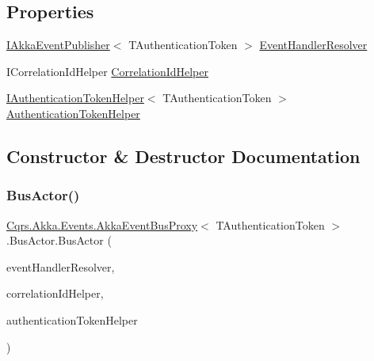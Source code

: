 \subsection*{Properties}
\begin{DoxyCompactItemize}
\item 
\hyperlink{interfaceCqrs_1_1Akka_1_1Events_1_1IAkkaEventPublisher}{I\+Akka\+Event\+Publisher}$<$ T\+Authentication\+Token $>$ \hyperlink{classCqrs_1_1Akka_1_1Events_1_1AkkaEventBusProxy_1_1BusActor_ae7986841b1bb97368936c52655b72f96}{Event\+Handler\+Resolver}
\item 
I\+Correlation\+Id\+Helper \hyperlink{classCqrs_1_1Akka_1_1Events_1_1AkkaEventBusProxy_1_1BusActor_a4857b2d33de5de94001abf96710b1308}{Correlation\+Id\+Helper}
\item 
\hyperlink{interfaceCqrs_1_1Authentication_1_1IAuthenticationTokenHelper}{I\+Authentication\+Token\+Helper}$<$ T\+Authentication\+Token $>$ \hyperlink{classCqrs_1_1Akka_1_1Events_1_1AkkaEventBusProxy_1_1BusActor_a5a276908d994a77c84e12e73ff73a286}{Authentication\+Token\+Helper}
\end{DoxyCompactItemize}


\subsection{Constructor \& Destructor Documentation}
\mbox{\label{classCqrs_1_1Akka_1_1Events_1_1AkkaEventBusProxy_1_1BusActor_aeb7cebaad75d810375d0adb82848974a}} 
\subsubsection{\texorpdfstring{Bus\+Actor()}{BusActor()}}
{\footnotesize\ttfamily \hyperlink{classCqrs_1_1Akka_1_1Events_1_1AkkaEventBusProxy}{Cqrs.\+Akka.\+Events.\+Akka\+Event\+Bus\+Proxy}$<$ T\+Authentication\+Token $>$.Bus\+Actor.\+Bus\+Actor (\begin{DoxyParamCaption}\item[{\hyperlink{interfaceCqrs_1_1Akka_1_1Events_1_1IAkkaEventPublisher}{I\+Akka\+Event\+Publisher}$<$ T\+Authentication\+Token $>$}]{event\+Handler\+Resolver,  }\item[{I\+Correlation\+Id\+Helper}]{correlation\+Id\+Helper,  }\item[{\hyperlink{interfaceCqrs_1_1Authentication_1_1IAuthenticationTokenHelper}{I\+Authentication\+Token\+Helper}$<$ T\+Authentication\+Token $>$}]{authentication\+Token\+Helper }\end{DoxyParamCaption})}




